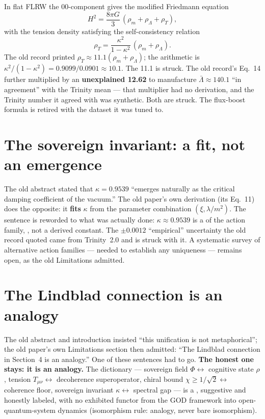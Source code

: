 \documentclass{alienfolio}
\begin{document}
In flat FLRW the 00-component gives the modified Friedmann equation
\begin{equation}
H^2 = \frac{8\pi G}{3}\,(\rho_m + \rho_\Lambda + \rho_T),
\end{equation}
with the tension density satisfying the self-consistency relation
\begin{equation}
\rho_T = \frac{\kappa^2}{1-\kappa^2}\,(\rho_m + \rho_\Lambda).
\end{equation}
The old record printed $\rho_T \approx 11.1(\rho_m + \rho_\Lambda)$;
the arithmetic is $\kappa^2/(1-\kappa^2) = 0.9099/0.0901 \approx
\mathbf{10.1}$. The 11.1 is struck. The old record's Eq.~14 further
multiplied by an \textbf{unexplained 12.62} to manufacture
$\bar{\Lambda} \approx 140.1$ ``in agreement'' with the Trinity mean
--- that multiplier had no derivation, and the Trinity number it
agreed with was synthetic. Both are struck. The flux-boost formula
is retired with the dataset it was tuned to.

\section{The sovereign invariant: a fit, not an emergence}
\label{sec:kappa}

The old abstract stated that $\kappa = 0.9539$ ``emerges naturally as
the critical damping coefficient of the vacuum.'' The old paper's
own derivation (its Eq.~11) does the opposite: it \textbf{fits}
$\kappa$ from the parameter combination $(\xi, \lambda/m^2)$. The
sentence is reworded to what was actually done: $\kappa \approx
0.9539$ is a  of the action family, ,
not a derived constant. The $\pm 0.0012$ ``empirical'' uncertainty
the old record quoted came from Trinity~2.0 and is struck with it.
A systematic survey of alternative action families --- needed to
establish any uniqueness --- remains open, as the old Limitations
admitted.

\section{The Lindblad connection is an analogy}
\label{sec:lindblad}

The old abstract and introduction insisted ``this unification is not
metaphorical''; the old paper's own Limitations section then
admitted: ``The Lindblad connection in Section~4 is an analogy.''
One of these sentences had to go. \textbf{The honest one stays: it
is an analogy.} The dictionary --- sovereign field $\Phi \leftrightarrow$
cognitive state $\rho$, tension $T_{\mu\nu} \leftrightarrow$
decoherence superoperator, chiral bound $\chi \ge 1/\sqrt{2}
\leftrightarrow$ coherence floor, sovereign invariant $\kappa
\leftrightarrow$ spectral gap --- is a 
, suggestive and honestly labeled, with no
exhibited functor from the GOD framework into open-quantum-system
dynamics (isomorphism rule: analogy, never bare isomorphism).
\end{document}
